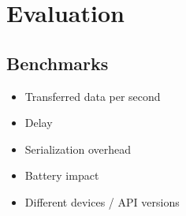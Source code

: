 \section{Evaluation}
\label{sec:evaluation}

\subsection{Benchmarks}
\begin{itemize}[noitemsep]
	\item Transferred data per second
	\item Delay
	\item Serialization overhead
	\item Battery impact
	\item Different devices / API versions
\end{itemize}


\lipsum[1]
\lipsum[2]
\lipsum[3]
\lipsum[4]
\lipsum[5]
\lipsum[1]
\lipsum[2]
\lipsum[3]
\lipsum[4]
\lipsum[5]


\clearpage